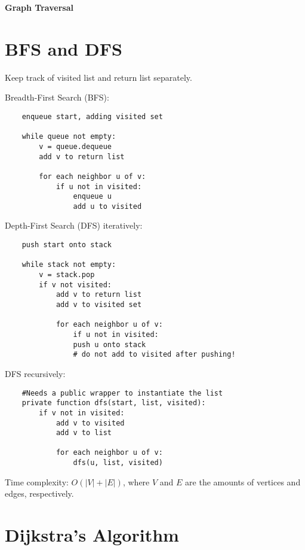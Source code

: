 \documentclass{exam}
\begin{document}
    
    \textbf{\Large{Graph Traversal}}
    
    \section{BFS and DFS}
    
    Keep track of visited list and return list separately.
    
    Breadth-First Search (BFS):
    
    \begin{lstlisting}
    enqueue start, adding visited set
        
    while queue not empty:
        v = queue.dequeue
        add v to return list
        
        for each neighbor u of v:
            if u not in visited:
                enqueue u
                add u to visited
    \end{lstlisting}
    
    Depth-First Search (DFS) iteratively:
    
    \begin{lstlisting}
    push start onto stack
    
    while stack not empty:
        v = stack.pop
        if v not visited:
            add v to return list
            add v to visited set
            
            for each neighbor u of v:
                if u not in visited:
                push u onto stack
                # do not add to visited after pushing! 
    \end{lstlisting}
    
    DFS recursively: 
    
    \begin{lstlisting}
    #Needs a public wrapper to instantiate the list
    private function dfs(start, list, visited):
        if v not in visited:
            add v to visited
            add v to list
            
            for each neighbor u of v:
                dfs(u, list, visited)
    \end{lstlisting}
    
    Time complexity: $O(|V| + |E|)$, where $V$ and $E$ are the amounts of vertices and edges, respectively.
    \newpage
    
    \section{Dijkstra's Algorithm}
    
\end{document}
